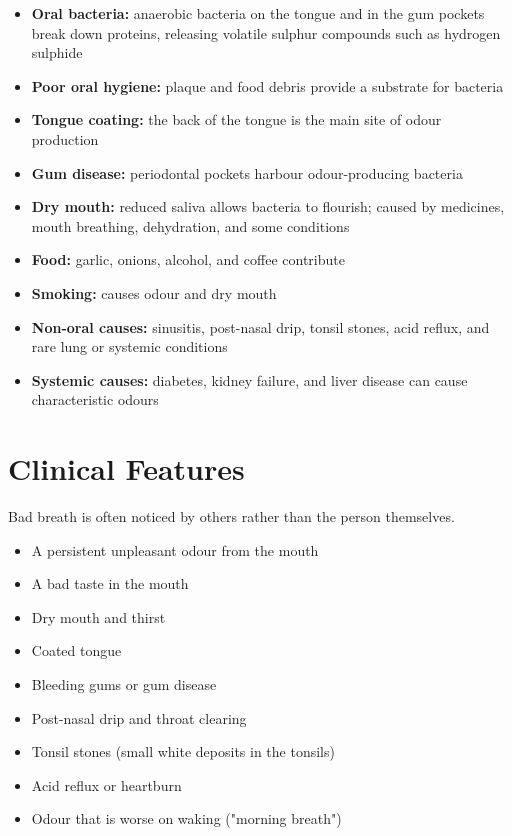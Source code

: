 \begin{itemize}
    \item \textbf{Oral bacteria:} anaerobic bacteria on the tongue and in the gum pockets break down proteins, releasing volatile sulphur compounds such as hydrogen sulphide
    \item \textbf{Poor oral hygiene:} plaque and food debris provide a substrate for bacteria
    \item \textbf{Tongue coating:} the back of the tongue is the main site of odour production
    \item \textbf{Gum disease:} periodontal pockets harbour odour-producing bacteria
    \item \textbf{Dry mouth:} reduced saliva allows bacteria to flourish; caused by medicines, mouth breathing, dehydration, and some conditions
    \item \textbf{Food:} garlic, onions, alcohol, and coffee contribute
    \item \textbf{Smoking:} causes odour and dry mouth
    \item \textbf{Non-oral causes:} sinusitis, post-nasal drip, tonsil stones, acid reflux, and rare lung or systemic conditions
    \item \textbf{Systemic causes:} diabetes, kidney failure, and liver disease can cause characteristic odours
\end{itemize}

\section*{Clinical Features}
Bad breath is often noticed by others rather than the person themselves.

\begin{itemize}
    \item A persistent unpleasant odour from the mouth
    \item A bad taste in the mouth
    \item Dry mouth and thirst
    \item Coated tongue
    \item Bleeding gums or gum disease
    \item Post-nasal drip and throat clearing
    \item Tonsil stones (small white deposits in the tonsils)
    \item Acid reflux or heartburn
    \item Odour that is worse on waking ("morning breath")
\end{itemize}

